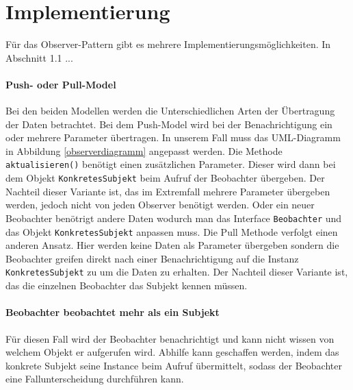 \section{Implementierung}
Für das Observer-Pattern gibt es mehrere Implementierungsmöglichkeiten. In Abschnitt 1.1 ... 


\paragraph{Push- oder Pull-Model} Bei den beiden Modellen werden die Unterschiedlichen Arten der Übertragung der Daten betrachtet. Bei dem Push-Model wird bei der Benachrichtigung ein oder mehrere Parameter übertragen. In unserem Fall muss das UML-Diagramm in Abbildung \ref{observerdiagramm} angepasst werden. Die Methode \texttt{aktualisieren()} benötigt einen zusätzlichen Parameter. Dieser wird dann bei dem Objekt \texttt{KonkretesSubjekt} beim Aufruf der Beobachter übergeben. Der Nachteil dieser Variante ist, das im Extremfall mehrere Parameter übergeben werden, jedoch nicht von jeden Observer benötigt werden. Oder ein neuer Beobachter benötrigt andere Daten wodurch man das Interface \texttt{Beobachter} und das Objekt \texttt{KonkretesSubjekt} anpassen muss.
Die Pull Methode verfolgt einen anderen Ansatz. Hier werden keine Daten als Parameter übergeben sondern die Beobachter greifen direkt nach einer Benachrichtigung auf die Instanz \texttt{KonkretesSubjekt} zu um die Daten zu erhalten. Der Nachteil dieser Variante ist, das die einzelnen Beobachter das Subjekt kennen müssen.


\paragraph{Beobachter beobachtet mehr als ein Subjekt} Für diesen Fall wird der Beobachter benachrichtigt und kann nicht wissen von welchem Objekt er aufgerufen wird. Abhilfe kann geschaffen werden, indem das konkrete Subjekt seine Instance beim Aufruf übermittelt, sodass der Beobachter eine Fallunterscheidung durchführen kann.

